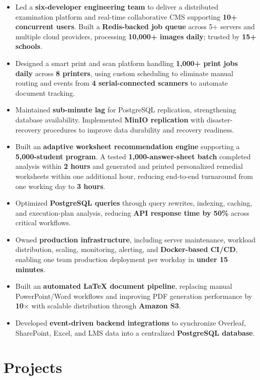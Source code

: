 \documentclass[11pt,a4paper]{article}
\begin{document}
\begin{itemize}
    \item Led a \textbf{six-developer engineering team} to deliver a distributed examination platform and real-time collaborative CMS supporting \textbf{10+ concurrent users}. Built a \textbf{Redis-backed job queue} across 5+ servers and multiple cloud providers, processing \textbf{10,000+ images daily}; trusted by \textbf{15+ schools}.
    \item Designed a smart print and scan platform handling \textbf{1,000+ print jobs daily} across \textbf{8 printers}, using custom scheduling to eliminate manual routing and events from \textbf{4 serial-connected scanners} to automate document tracking.
    \item Maintained \textbf{sub-minute lag} for PostgreSQL replication, strengthening database availability. Implemented \textbf{MinIO replication} with disaster-recovery procedures to improve data durability and recovery readiness.
    \item Built an \textbf{adaptive worksheet recommendation engine} supporting a \textbf{5,000-student program}. A tested \textbf{1,000-answer-sheet batch} completed analysis within \textbf{2 hours} and generated and printed personalized remedial worksheets within one additional hour, reducing end-to-end turnaround from one working day to \textbf{3 hours}.
    \item Optimized \textbf{PostgreSQL queries} through query rewrites, indexing, caching, and execution-plan analysis, reducing \textbf{API response time by 50\%} across critical workflows.
    \item Owned \textbf{production infrastructure}, including server maintenance, workload distribution, scaling, monitoring, alerting, and \textbf{Docker-based CI/CD}, enabling one team production deployment per workday in \textbf{under 15 minutes}.
    \item Built an \textbf{automated LaTeX document pipeline}, replacing manual PowerPoint/Word workflows and improving PDF generation performance by \textbf{10\(\times\)} with scalable distribution through \textbf{Amazon S3}.
    \item Developed \textbf{event-driven backend integrations} to synchronize Overleaf, SharePoint, Excel, and LMS data into a centralized \textbf{PostgreSQL database}.
\end{itemize}

\section{\Large{Projects}}
\end{document}
